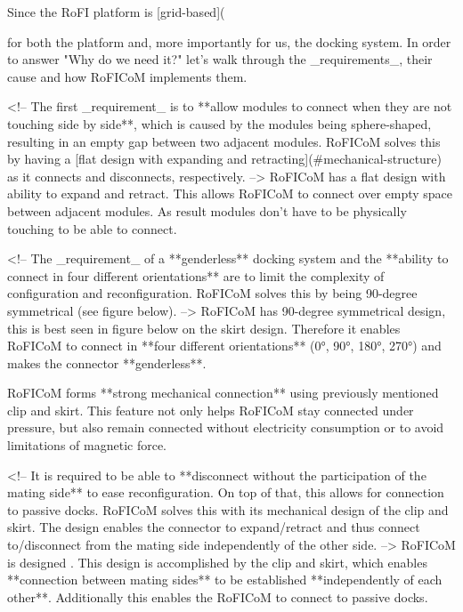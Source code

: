 \documentclass[
  digital,     %
  oneside,     %
  nosansbold,  %
  nocolorbold, %
  lof,         %
  lot,         %
]{fithesis4}
\begin{document}
Since the RoFI platform is [grid-based]({%
for both the platform and, more importantly for us, the docking system.
In order to answer "Why do we need it?" let's walk through the _requirements_, their cause and how RoFICoM implements them.

<!-- The first _requirement_ is to **allow modules to connect
when they are not touching side by side**, which is caused by the modules being sphere-shaped, resulting in an empty gap between two adjacent modules. RoFICoM solves this by having a [flat design with expanding and retracting](#mechanical-structure) as it connects and disconnects, respectively. -->
RoFICoM has a flat design with ability to expand and retract. This allows RoFICoM to connect over empty space between
adjacent modules. As result modules don't have to be physically touching to be able to connect.

<!-- The _requirement_ of a **genderless** docking system and the **ability to connect in four different orientations** are to limit the
complexity of configuration and reconfiguration. RoFICoM solves this by being 90-degree symmetrical (see figure below). -->
RoFICoM has 90-degree symmetrical design, this is best seen in figure below on the skirt design. Therefore it enables
RoFICoM to connect in **four different orientations** (0°, 90°, 180°, 270°) and makes the connector **genderless**.

{%

RoFICoM forms **strong mechanical connection** using previously mentioned clip and skirt. This feature not only helps RoFICoM stay connected under pressure, but also remain connected without electricity consumption or to avoid limitations of magnetic force.

{%

<!-- It is required to be able to **disconnect without the participation of the mating side** to ease reconfiguration. On top of
that, this allows for connection to passive docks. RoFICoM solves this with its mechanical design of the clip and skirt.
The design enables the connector to expand/retract and thus connect to/disconnect from the mating side independently
of the other side. -->
RoFICoM is designed . This design is accomplished by the clip and skirt, which enables **connection between mating sides** to be established **independently of each other**. Additionally this enables the RoFICoM to connect to passive docks.

}}}
\end{document}

